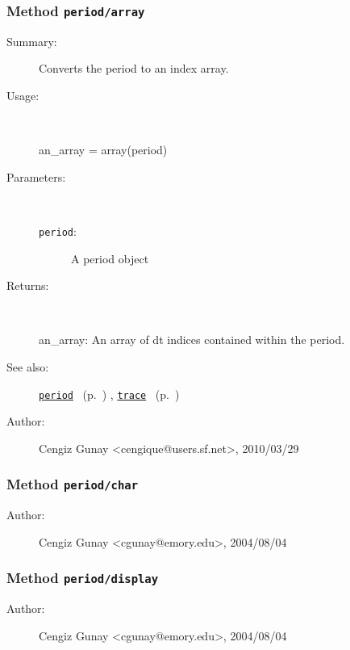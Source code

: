\subsubsection[Method \texttt{array}]{Method \texttt{period/array}}%
%
\label{ref_period__array}%
\hypertarget{ref_period__array}{}%
\begin{description}
\item[Summary:]Converts the period to an index array. 
%
\item[Usage:]~%
\begin{lyxcode}%
an\_array = array(period)
%
\end{lyxcode}%
%
%
\item[Parameters:]~
\begin{description}%
\item[\texttt{period}:]
 A period object
\end{description}%
%
\item[Returns:
]~

   an\_array: An array of dt indices contained within the period.
%
%
\item[See also:]%
\hyperlink{ref_period}{\texttt{period}}%
\ (p.~\pageref{ref_period})%
%
, \hyperlink{ref_trace}{\texttt{trace}}%
\ (p.~\pageref{ref_trace})%
%
%
\item[Author:]%
Cengiz Gunay <cengique@users.sf.net>, 2010/03/29
%
\end{description}
\methodline%
\subsubsection[Method \texttt{char}]{Method \texttt{period/char}}%
%
\label{ref_period__char}%
\hypertarget{ref_period__char}{}%
\begin{description}
%
%
%
%
%
%
%
\item[Author:]%
Cengiz Gunay <cgunay@emory.edu>, 2004/08/04
%
\end{description}
\methodline%
\subsubsection[Method \texttt{display}]{Method \texttt{period/display}}%
%
\label{ref_period__display}%
\hypertarget{ref_period__display}{}%
\begin{description}
%
%
%
%
%
%
%
\item[Author:]%
Cengiz Gunay <cgunay@emory.edu>, 2004/08/04
%
\end{description}
\methodline%
